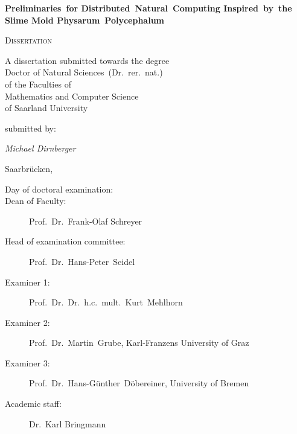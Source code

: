 
\begin{titlepage}
	\centering
	\null\vfill
	
	{\huge\bfseries Preliminaries~for Distributed~Natural~Computing Inspired~by~the Slime Mold Physarum~Polycephalum\par}
	


	\vfill

	{\scshape\Large Dissertation}
	\vfill


	{\large A dissertation submitted towards the degree\\
	Doctor of Natural Sciences~(Dr.~rer.~nat.)\\
	of the Faculties of\\
	Mathematics and Computer Science\\
	of Saarland University}


	\vfill
	submitted by:
	\vfill

	{\Large\itshape Michael Dirnberger}

	\vfill

	{\large Saarbrücken, \thesisdate{}}
	\vfill
\end{titlepage}


\newpage
\thispagestyle{plain}
\null
\vfill
\begin{description}
	\item[Day of doctoral examination:] 
 	\item[Dean of Faculty:] Prof.~Dr.~Frank-Olaf Schreyer
 	\item[Head of examination committee:] Prof.~Dr.~Hans-Peter~Seidel
	\item[Examiner 1:] Prof.~Dr.~Dr.~h.c.~mult.~Kurt~Mehlhorn
	\item[Examiner 2:] Prof.~Dr.~Martin~Grube, Karl-Franzens University of Graz
	\item[Examiner 3:] Prof.~Dr.~Hans-Günther~Döbereiner, University of Bremen
	\item[Academic staff:] Dr.~Karl Bringmann
\end{description}

\newpage
